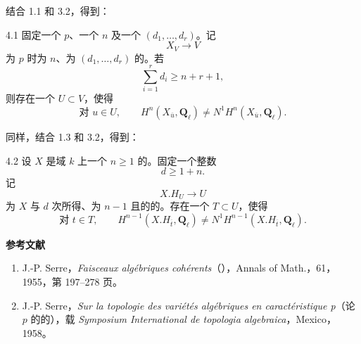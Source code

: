 结合 1.1 和 3.2，得到：
\begin{SGAresult}{}{4.1}
固定一个 $p$、一个 $n$ 及一个 $(d_1,\ldots,d_r)$。记
\[
 X_V\longrightarrow V
 \tag{4.1.0}
\]
为 $p$ 时为 $n$、为 $(d_1,\ldots,d_r)$ 的。若
\[
 \sum_{i=1}^r d_i\geq n+r+1,
 \tag{4.1.1}
\]
则存在一个 $U\subset V$，使得
\[
 \text{对 }u\in U,\qquad
 H^n(X_{\overline u},\mathbf Q_\ell)\ne N^1H^n(X_{\overline u},\mathbf Q_\ell).
 \tag{4.1.2}
\]
\end{SGAresult}

同样，结合 1.3 和 3.2，得到：
\begin{SGAresult}{}{4.2}
设 $X$ 是域 $k$ 上一个 $n\geq1$ 的。固定一个整数
\[
 d\geq1+n.
 \tag{4.2.1}
\]
记
\[
 X.H_U\longrightarrow U
 \tag{4.2.2}
\]
为 $X$ 与 $d$ 次所得、为 $n-1$ 且的的。存在一个 $T\subset U$，使得
\[
 \text{对 }t\in T,\qquad
 H^{n-1}(X.H_{\overline t},\mathbf Q_\ell)
 \ne N^1H^{n-1}(X.H_{\overline t},\mathbf Q_\ell).
 \tag{4.2.3}
\]
\end{SGAresult}

\textbf{参考文献}
\begin{enumerate}
 \item[{[1]}] J.-P. Serre，\emph{Faisceaux algébriques cohérents}（），Annals of Math.，61，1955，第 197--278 页。
 \item[{[2]}] J.-P. Serre，\emph{Sur la topologie des variétés algébriques en caractéristique p}（论 $p$ 的的），载 \emph{Symposium International de topologia algebraica}，Mexico，1958。
\end{enumerate}
